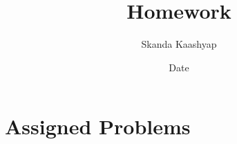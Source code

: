 \documentclass[11pt]{article}
\title{Homework }
\author{Skanda Kaashyap}
\date{Date}
\begin{document}
\maketitle

\section*{Assigned Problems}
\end{document}
